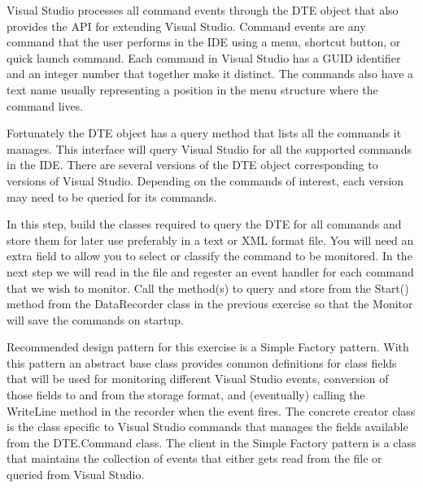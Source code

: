  \begin{Exercise}[ type={program}, difficulty={1}]
Visual Studio processes all command events through the DTE object that also provides the API for extending Visual Studio.  Command events are any command that the user performs in the IDE using a menu, shortcut button, or quick launch command.  Each command in Visual Studio has a GUID identifier and an integer number that together make it distinct.  The commands also have a text name usually representing a position in the menu structure where the command lives.

Fortunately the DTE object has a query method that lists all the commands it manages.  This interface will query Visual Studio for all the supported commands in the IDE.  There are several versions of the DTE object corresponding to versions of Visual Studio.  Depending on the commands of interest, each version may need to be queried for its commands.  

In this step, build the classes required to query the DTE for all commands and store them for later use preferably in a text or XML format file.  You will need an extra field to allow you to select or classify the command to be monitored.  In the next step we will read in the file and regester an event handler for each command that we wish to monitor.  Call the method(s) to query and store from the Start() method from the DataRecorder class in the previous exercise so that the Monitor will save the commands on startup.

Recommended design pattern for this exercise is a Simple Factory pattern.  With this pattern an abstract base class provides common definitions for class fields that will be used for monitoring different Visual Studio events, conversion of those fields to and from the storage format, and (eventually) calling the WriteLine method in the recorder when the event fires.  The concrete creator class is the class specific to Visual Studio commands that manages the fields available from the DTE.Command class.  The client in the Simple Factory pattern is a class that maintains the collection of events that either gets read from the file or queried from Visual Studio.
\end{Exercise}


